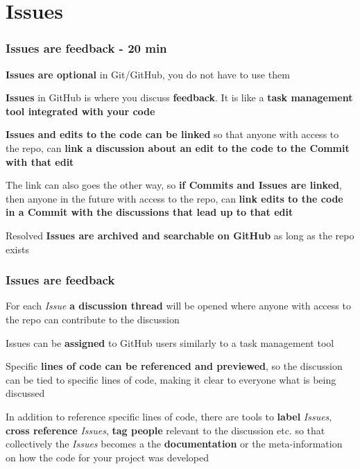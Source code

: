 \documentclass[aspectratio=169]{beamer} %
\begin{document}
\section{Issues}

\begin{frame}
	\frametitle{Issues are feedback - 20 min}

	\textbf{Issues are optional} in Git/GitHub, you do not have to use them

	\vspace{.20cm}

	\textbf{Issues} in GitHub is where you discuss \textbf{feedback}. It is like a \textbf{task management tool integrated with your code}

	\vspace{.20cm}

	\textbf{Issues and edits to the code can be linked} so that anyone with access to the repo, can \textbf{link a discussion about an edit to the code to the Commit with that edit}

	\vspace{.20cm}

	The link can also goes the other way, so \textbf{if Commits and Issues are linked}, then anyone in the future with access to the repo, can \textbf{link edits to the code in a Commit with the discussions that lead up to that edit}

	\vspace{.20cm}

	Resolved \textbf{Issues are archived and searchable on GitHub} as long as the repo exists
\end{frame}

\begin{frame}
	\frametitle{Issues are feedback}

	For each \textit{Issue} \textbf{a discussion thread} will be opened where anyone with access to the repo can contribute to the discussion

	\vspace{.25cm}

	Issues can be \textbf{assigned} to GitHub users similarly to a task management tool

	\vspace{.25cm}

	Specific \textbf{lines of code can be referenced and previewed}, so the discussion can be tied to specific lines of code, making it clear to everyone what is being discussed

	\vspace{.25cm}

	In addition to reference specific lines of code, there are tools to \textbf{label} \textit{Issues}, \textbf{cross reference} \textit{Issues}, \textbf{tag people} relevant to the discussion etc. so that collectively the \textit{Issues} becomes a the \textbf{documentation} or the meta-information on how the code for your project was developed
\end{frame}
\end{document}
